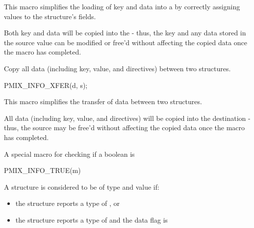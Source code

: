 This macro simplifies the loading of key and data into a  by correctly assigning values to the structure's fields.

\adviceuserstart
Both key and data will be copied into the  - thus, the key and any data stored in the source value can be modified or free'd without affecting the copied data once the macro has completed.
\adviceuserend


Copy all data (including key, value, and directives) between two  structures.

\cspecificstart
\begin{codepar}
PMIX_INFO_XFER(d, s);
\end{codepar}
\cspecificend

\begin{arglist}
\end{arglist}

This macro simplifies the transfer of data between two structures.

\adviceuserstart
All data (including key, value, and directives) will be copied into the destination  - thus, the source  may be free'd without affecting the copied data once the macro has completed.
\adviceuserend



A special macro for checking if a boolean  is 

\cspecificstart
\begin{codepar}
PMIX_INFO_TRUE(m)
\end{codepar}
\cspecificend

\begin{arglist}
\end{arglist}

A  structure is considered to be of type  and value  if:

\begin{itemize}
    \item the structure reports a type of , or
    \item the structure reports a type of  and the data flag is 
\end{itemize}


